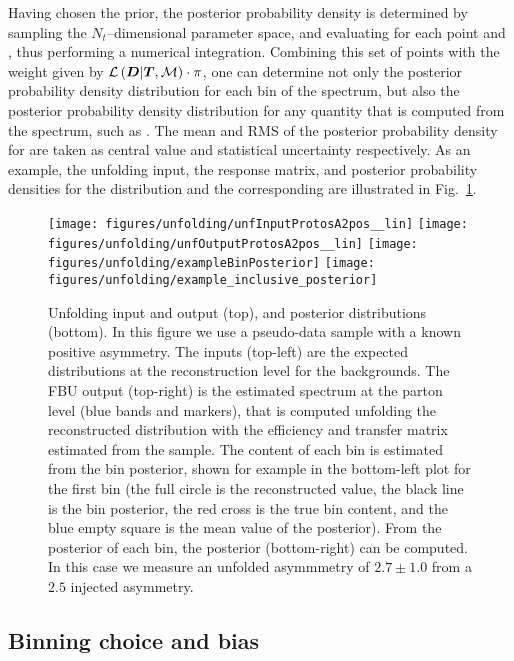 Having chosen the prior, the posterior probability density
\conditionalProb{\Truth{}}{\Data{}} is determined by sampling the
$N_t$--dimensional parameter space, and evaluating for each point
\conditionalLhood{\Data{}}{\Truth{}} and \prior{}, thus performing a
numerical integration.
Combining this set of points with the weight given by
$\mathcal{L}\left(\boldsymbol{D}{}|\boldsymbol{T}{},\mathcal{M}{}\right)\cdot{}\pi{}$, one
can determine not only the posterior probability density distribution
for each bin of the spectrum, but also the posterior probability
density distribution for any quantity that is computed from the
spectrum, such as \ac{}. The mean and RMS of the posterior probability
density for \ac{} are taken as central value and statistical uncertainty respectively.
As an example, the unfolding input, the response matrix, and posterior
probability densities for the \dy{} distribution and the corresponding
\ac{} are illustrated in Fig.~\ref{fig:posteriorIncl}.
\begin{figure}[!htb]\centering
  \texttt{[image: figures/unfolding/unfInputProtosA2pos\_\_lin]}
  \texttt{[image: figures/unfolding/unfOutputProtosA2pos\_\_lin]}
  \texttt{[image: figures/unfolding/exampleBinPosterior]}
  \texttt{[image: figures/unfolding/example\_inclusive\_posterior]}
  \caption{
    \label{fig:posteriorIncl}
   Unfolding input and output (top), and posterior distributions
   (bottom). In this figure we use a pseudo-data sample with a known
   positive asymmetry.  The inputs (top-left) are the
   expected \dy{} distributions at the reconstruction level for the
   backgrounds. The FBU output (top-right) is the estimated
   spectrum at the parton level (blue bands and markers), that is
   computed unfolding the \protos{} reconstructed \dy{} distribution
   with the efficiency and transfer matrix estimated from
   the \alpgen{} sample. The content of each bin is estimated from the
   bin posterior, shown for example in the bottom-left plot for the
   first bin (the full circle is the reconstructed value, the black
   line is the bin posterior, the red cross is the true bin content,
   and the blue empty square is the mean value of the posterior). From
   the posterior of each bin, the \ac{} posterior (bottom-right) can
   be computed. In this case we measure an unfolded asymmmetry of
   $2.7\pm1.0$ from a $2.5$ injected asymmetry.
   }
\end{figure}

\subsection{Binning choice and bias}

